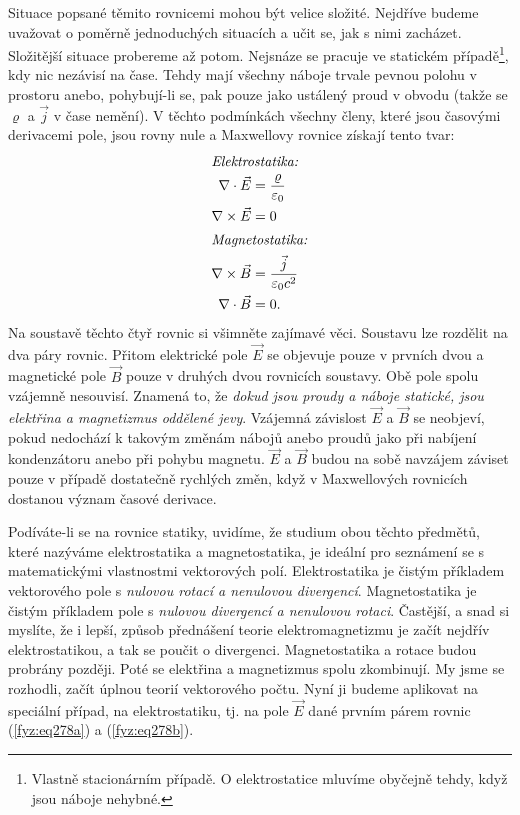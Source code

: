 {    Situace popsané těmito rovnicemi mohou být velice složité. Nejdříve budeme uvažovat o poměrně
    jednoduchých situacích a učit se, jak s nimi zacházet. Složitější situace probereme až potom. 
    Nejsnáze se pracuje ve statickém případě\footnote{Vlastně stacionárním případě. O 
    elektrostatice mluvíme obyčejně tehdy, když jsou náboje nehybné.}, kdy nic nezávisí na čase. 
    Tehdy mají všechny náboje trvale pevnou polohu v prostoru anebo, pohybují-li se, pak pouze jako 
    ustálený proud v obvodu (takže se \(\varrho\) a \(\vec{j}\) v čase nemění). V těchto podmínkách 
    všechny členy, které jsou časovými derivacemi pole, jsou rovny nule a Maxwellovy rovnice 
    získají tento tvar:
    \begin{subequations}\label{fyz:eq278}
      \begin{align}
       \shortintertext{\emph{Elektrostatika:}} 
        \nabla\cdot\vec{E} &=  \frac{\varrho}{\varepsilon_0}    \label{fyz:eq278a}   \\  
          \nabla\times\vec{E} &= 0                                 \label{fyz:eq278b}   \\
        \shortintertext{\emph{Magnetostatika:}}  
          \nabla\times\vec{B} &=  \frac{\vec{j}}{\varepsilon_0c^2} \label{fyz:eq278c}   \\
        \nabla\cdot\vec{B} &= 0.                                \label{fyz:eq278d}
      \end{align}
    \end{subequations}
    Na soustavě těchto čtyř rovnic si všimněte zajímavé věci. Soustavu lze rozdělit na dva páry 
    rovnic. Přitom elektrické pole \(\vec{E}\) se objevuje pouze v prvních dvou a magnetické pole 
    \(\vec{B}\) pouze v druhých dvou rovnicích soustavy. Obě pole spolu vzájemně nesouvisí. Znamená 
    to, že \emph{dokud jsou proudy a náboje statické, jsou elektřina a magnetizmus oddělené jevy}. 
    Vzájemná závislost \(\vec{E}\) a \(\vec{B}\) se neobjeví, pokud nedochází k takovým změnám 
    nábojů anebo proudů jako při nabíjení kondenzátoru anebo při pohybu magnetu. \(\vec{E}\) a 
    \(\vec{B}\) budou na sobě navzájem záviset pouze v případě dostatečně rychlých změn, když v 
    Maxwellových rovnicích dostanou význam časové derivace.
     
    Podíváte-li se na rovnice statiky, uvidíme, že studium obou těchto předmětů, které nazýváme     
    elektrostatika a magnetostatika, je ideální pro seznámení se s matematickými vlastnostmi 
    vektorových polí. Elektrostatika je čistým příkladem vektorového pole s \emph{nulovou rotací a 
    nenulovou divergencí}. Magnetostatika je čistým příkladem pole s \emph{nulovou divergencí a 
    nenulovou rotaci}. Častější, a snad si myslíte, že i lepší, způsob přednášení teorie 
    elektromagnetizmu je začít nejdřív elektrostatikou, a tak se poučit o divergenci. 
    Magnetostatika a rotace budou probrány později. Poté se elektřina a magnetizmus spolu 
    zkombinují. My jsme se rozhodli, začít úplnou teorií vektorového počtu. Nyní ji budeme 
    aplikovat na speciální případ, na elektrostatiku, tj. na pole \(\vec{E}\) dané prvním párem 
    rovnic (\ref{fyz:eq278a}) a (\ref{fyz:eq278b}).
     
}
